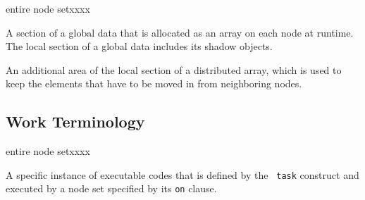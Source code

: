 \begin{namelist}{entire node setxxxx}


 A section of a global data that is allocated as an array on each node
 at runtime.
%
 The local section of a global data includes its shadow objects.


 An additional area of the local section of a distributed array, which
 is used to keep the elements that have to be moved in from neighboring
 nodes.


\end{namelist}


\subsection{Work Terminology}

\begin{namelist}{entire node setxxxx}


 A specific instance of executable codes that is defined by the {\tt
 task} construct and executed by a node set specified by its {\tt on}
 clause.


%

%


\end{namelist}



